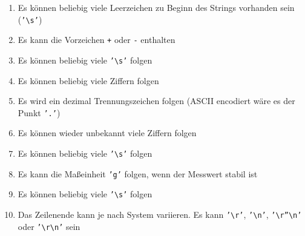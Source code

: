 \begin{enumerate}
\singlespacing
\item Es können beliebig viele Leerzeichen zu Beginn des Strings vorhanden sein (\texttt{'\textbackslash s'})
\item Es kann die Vorzeichen \texttt{+} oder \texttt{-} enthalten
\item Es können beliebig viele \texttt{'\textbackslash s'} folgen
\item Es können beliebig viele Ziffern folgen
\item Es wird ein dezimal Trennungszeichen folgen (ASCII encodiert wäre es der Punkt \texttt{'.'})
\item Es können wieder unbekannt viele Ziffern folgen
\item Es können beliebig viele \texttt{'\textbackslash s'} folgen
\item Es kann die Maßeinheit \texttt{'g'} folgen, wenn der Messwert stabil ist
\item Es können beliebig viele \texttt{'\textbackslash s'} folgen
\item Das Zeilenende kann je nach System variieren. Es kann \texttt{'\textbackslash r'}, \texttt{'\textbackslash n'}, \texttt{'\textbackslash r''\textbackslash n'} oder \texttt{'\textbackslash r\textbackslash n'} sein
\end{enumerate}


